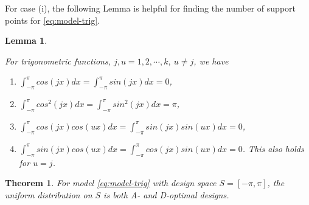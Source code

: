 \documentclass[
]{book}
\providecommand{\tightlist}{%
  \setlength{\itemsep}{0pt}\setlength{\parskip}{0pt}}
\newtheorem{theorem}{Theorem}[chapter]
\newtheorem{lemma}{Lemma}[chapter]
\theoremstyle{definition}
\theoremstyle{definition}
\theoremstyle{definition}
\theoremstyle{definition}
\theoremstyle{remark}
\begin{document}
For case (i), the following Lemma is helpful for finding the number of support points for \eqref{eq:model-trig}.

\begin{lemma}
\protect\hypertarget{lem:tring-property}{}\label{lem:tring-property}

For trigonometric functions, \(j, u =1,2,\cdots,k,~u\ne j\), we have

\begin{enumerate}
\def\labelenumi{\arabic{enumi}.}
\tightlist
\item
  \(\int_{-\pi}^{\pi}cos(jx)dx=\int_{-\pi}^{\pi}sin(jx)dx=0\),
\item
  \(\int_{-\pi}^{\pi}cos^2(jx)dx=\int_{-\pi}^{\pi}sin^2(jx)dx=\pi\),
\item
  \(\int_{-\pi}^{\pi}cos(jx)cos(ux)dx=\int_{-\pi}^{\pi}sin(jx)sin(ux)dx=0\),
\item
  \(\int_{-\pi}^{\pi}sin(jx)cos(ux)dx=\int_{-\pi}^{\pi}cos(jx)sin(ux)dx=0\). This also holds for \(u=j\).
\end{enumerate}

\end{lemma}

\begin{theorem}
For model \eqref{eq:model-trig} with design space \(S=[-\pi,\pi]\), the uniform distribution on \(S\) is both A- and D-optimal designs.
\end{theorem}
\end{document}
